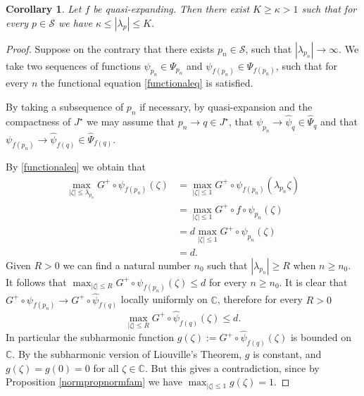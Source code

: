 \documentclass[10pt,a4paper]{article}
\newtheorem{corollary}[theorem]{Corollary}
\begin{document}
\begin{corollary}
\label{boundedlambda}
Let $f$ be quasi-expanding. Then there exist $K\geq\kappa>1$ such that for every $p\in \mathcal S$ we have $\kappa\leq|\lambda_p|\leq K$.
\end{corollary}
\begin{proof}
Suppose on the contrary that there exists $p_n\in\mathcal S$, such that $|\lambda_{p_n}|\to\infty$. We take two sequences of functions $\psi_{p_n}\in\Psi_{p_n}$ and $\psi_{f(p_n)}\in\Psi_{f(p_n)}$, such that for every $n$ the functional equation \eqref{functionaleq} is satisfied.

By taking a subsequence of $p_n$ if necessary, by quasi-expansion and the compactness of $J^\star$ we may assume that $p_n\to q\in J^\star$, that $\psi_{p_n}\to\widehat\psi_q\in\widehat\Psi_q$ and that $\psi_{f(p_n)}\to\widehat\psi_{f(q)}\in\widehat\Psi_{f(q)}$.

By \eqref{functionaleq} we obtain that\begin{align*}
\max_{|\zeta|\leq \lambda_{p_n}}G^+\circ\psi_{f(p_n)}(\zeta)&=\max_{|\zeta|\leq 1}G^+\circ\psi_{f(p_n)}(\lambda_{p_n}\zeta)\\
&=\max_{|\zeta|\leq 1}G^+\circ f\circ\psi_{p_n}(\zeta)\\
&=d\max_{|\zeta|\leq 1}G^+\circ\psi_{p_n}(\zeta)\\
&=d.
\end{align*}
Given $R>0$ we can find a natural number $n_0$ such that $|\lambda_{p_n}|\geq R$ when $n\geq n_0$. It follows that $\max_{|\zeta|\leq R}G^+\circ\psi_{f(p_n)}(\zeta)\leq d$ for every $n\geq n_0$. It is clear that $G^+\circ\psi_{f(p_n)}\to G^+\circ\widehat\psi_{f(q)}$ locally uniformly on $\mathbb C$, therefore for every $R>0$
\[
\max_{|\zeta|\leq R} G^+\circ \widehat\psi_{f(q)}(\zeta)\leq d.
\]
In particular the subharmonic function $g(\zeta):=G^+\circ\widehat\psi_{f(q)}(\zeta)$ is bounded on $\mathbb C$. By the subharmonic version of Liouville's Theorem, $g$ is constant, and $g(\zeta)=g(0)=0$ for all $\zeta\in\mathbb C$. But this gives a contradiction, since by Proposition \ref{normpropnormfam} we have $\max_{|\zeta|\leq 1}g(\zeta)=1$.


\end{proof}
\end{document}

